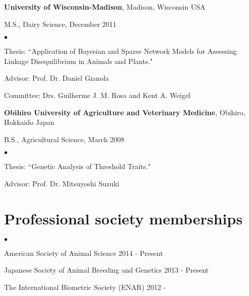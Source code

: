 \documentclass[margin,line,10pt]{res}
\newenvironment{list1}{
  \begin{list}{\ding{113}}{%
      \setlength{\itemsep}{0in}
      \setlength{\parsep}{0in} \setlength{\parskip}{0in}
      \setlength{\topsep}{0in} \setlength{\partopsep}{0in} 
      \setlength{\leftmargin}{0.17in}}}{\end{list}}
\newenvironment{list2}{
  \begin{list}{$\bullet$}{%
      \setlength{\itemsep}{0in}
      \setlength{\parsep}{0in} \setlength{\parskip}{0in}
      \setlength{\topsep}{0in} \setlength{\partopsep}{0in} 
      \setlength{\leftmargin}{0.2in}}}{\end{list}}
\begin{document}
\begin{resume}
{\bf University of Wisconsin-Madison}, Madison, Wisconsin USA\\
\vspace*{-.1in}
\begin{list1}
\item[] M.S., Dairy Science, December 2011
\begin{list2}
\vspace*{.05in}
\item Thesis: ``Application of Bayesian and Sparse Network Models for Assessing Linkage Disequilibrium in Animals and Plants." 
\item Advisor: Prof. Dr. Daniel Gianola 
\item Committee: Drs. Guilherme J. M. Rosa and Kent A. Weigel
\end{list2}
\vspace*{.05in}
\end{list1}


{\bf Obihiro University of Agriculture and Veterinary Medicine}, Obihiro, Hokkaido Japan\\
\vspace*{-.1in}
\begin{list1}
\item[] B.S., Agricultural Science,  March 2008
\begin{list2}
\vspace*{.05in}
\item Thesis:  ``Genetic Analysis of Threshold Traits." 
\item Advisor: Prof. Dr. Mitsuyoshi Suzuki
\end{list2}
\end{list1}









\vspace{0.5cm}
\section{\sc Professional society memberships}
\begin{list2}
\item American Society of Animal Science 2014 - Present
\vspace{0.3cm}
\item Japanese Society of Animal Breeding and Genetics 2013 - Present 
\vspace{0.3cm}
\item The International Biometric Society (ENAR) 2012 - 
\end{list2}




\end{resume}
\end{document}
